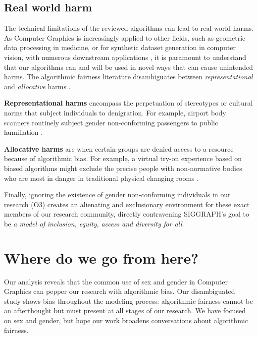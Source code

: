 \documentclass[nonacm,sigconf,review,balance=false]{acmart}
\begin{document}
\subsection{Real world harm}

The technical limitations of the reviewed algorithms can lead to real world harms. As Computer Graphics is increasingly applied to other fields, such as geometric data processing in medicine, or for synthetic dataset generation in computer vision, with numerous downstream applications \cite{cars, chen2021synthetic, dhs}, it is paramount to understand that our algorithms can and will be used in novel ways that can cause unintended harms. The algorithmic fairness literature disambiguates between {\em representational} and {\em allocative} harms \cite{barocas-hardt-narayanan}.

{\bf Representational harms} encompass the perpetuation of stereotypes or cultural norms that subject individuals to denigration. For example, airport body scanners routinely subject gender non-conforming passengers to public humillation \cite{tsa}.

{\bf Allocative harms} are when certain groups are denied access to a resource because of algorithmic bias. For example, a virtual try-on experience based on biased algorithms might exclude the precise people with non-normative bodies who are most in danger in traditional physical changing rooms \cite{changingroom}.

Finally, ignoring the existence of gender non-conforming individuals in our research (O3) creates an alienating and exclusionary environment for these exact members of our research community, directly contravening SIGGRAPH's goal to be \emph{a model of inclusion, equity, access and diversity for all}.

\vspace{-0.1cm}
\section{Where do we go from here?}

Our analysis reveals that the common use of sex and gender in Computer Graphics can pepper our research with algorithmic bias. Our disambiguated study shows bias throughout the modeling process: algorithmic fairness cannot be an afterthought but must present at all stages of our research. We have focused on sex and gender, but hope our work broadens conversations about algorithmic fairness.%
\end{document}

